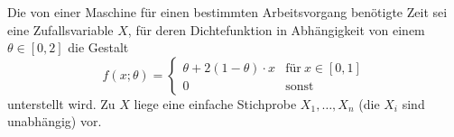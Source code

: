 \documentclass{abgabe}
\begin{document}
\begin{questions}
    \question
    Die von einer Maschine für einen bestimmten Arbeitsvorgang benötigte Zeit sei eine Zufallsvariable $X$, für deren Dichtefunktion in Abhängigkeit von einem $\theta \in [0, 2]$ die Gestalt
    \[ 
        f(x;\theta) = 
        \begin{cases}
            \theta + 2(1-\theta)\cdot x & \text{für} \ x \in [0,1] \\ 
            0                           & \text{sonst}
        \end{cases}
    \]
    unterstellt wird.
    Zu $X$ liege eine einfache Stichprobe $X_1, \ldots , X_n$ (die $X_i$ sind unabhängig) vor.
\end{questions}
\end{document}
